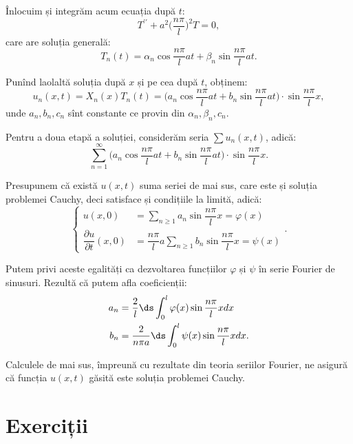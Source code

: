 Înlocuim și integrăm acum ecuația după $ t $:
\[
    T^{\prime\prime} + a^2\Big( \dfrac{n\pi}{l} \Big)^2 T = 0,
\]
care are soluția generală:
\[
    T_n(t) = \alpha_n \cos \dfrac{n\pi}{l} at + \beta_n\sin \dfrac{n\pi}{l} at.
\]

Punînd laolaltă soluția după $ x $ și pe cea după $ t $, obținem:
\begin{equation} \label{eq:coarda-particulara}
    u_n(x, t) = X_n(x) T_n(t) = \Big( a_n \cos \dfrac{n\pi}{l} at + %
    b_n \sin \dfrac{n\pi}{l} at \Big) \cdot \sin \dfrac{n\pi}{l} x,
\end{equation}
unde $ a_n, b_n, c_n $ sînt constante ce provin din $ \alpha_n, \beta_n, c_n $.

Pentru a doua etapă a soluției, considerăm seria $ \sum u_n(x, t) $, adică:
\[
    \sum_{n = 1}^\infty \Big(a_n\cos\dfrac{n\pi}{l} at + %
    b_n \sin \dfrac{n\pi}{l} at\Big) \cdot \sin \dfrac{n \pi}{l} x.
\]

Presupunem că există $ u(x, t) $ suma seriei de mai sus, care este și soluția
problemei Cauchy, deci satisface și condițiile la limită, adică:
\[
    \begin{cases}
        u(x, 0) &= \sum_{n\geq 1} a_n \sin \dfrac{n\pi}{l} x = \varphi(x) \\
        \dfrac{\partial u}{\partial t}(x, 0) &= \dfrac{n\pi}{l}a \sum_{n \geq 1} b_n\sin\dfrac{n\pi}{l}x = \psi(x)
    \end{cases}.
\]

Putem privi aceste egalități ca dezvoltarea funcțiilor $ \varphi $ și $ \psi $ în serie
Fourier de sinusuri. Rezultă că putem afla coeficienții:
\begin{eqnarray} \label{eq:fourier}
    a_n &= \dfrac{2}{l} \ds\int_0^l \varphi(x) \sin \dfrac{n\pi}{l} xdx \\
    b_n &= \dfrac{2}{n\pi a} \ds\int_0^l \psi(x) \sin \dfrac{n \pi}{l} xdx.
\end{eqnarray}

\begin{remark}\label{rk:coarda-finita-fourier}
    Calculele de mai sus, împreună cu rezultate din teoria seriilor Fourier, ne asigură
    că funcția $ u(x, t) $ găsită este soluția problemei Cauchy.
\end{remark}


\section{Exerciții}

